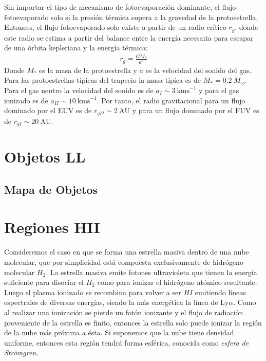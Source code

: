Sin importar el tipo de mecanismo de fotoevaporación dominante, el flujo fotoevaporado solo si la presión térmica supera a la gravedad de la protoestrella. Entonces, el flujo fotoevaporado solo existe a partir de un radio crítico $r_g$, donde este radio se estima a partir del balance entre la energía necesaria para escapar de una órbita kepleriana y la energía térmica:
\begin{align}
  r_g = \frac{GM_*}{a^2}
\end{align}
Donde $M_*$ es la masa de la protoestrella y $a$ es la velocidad del sonido del gas. Para las protoestrellas típicas del trapecio la masa típica es de
$M_* = 0.2~M_\odot$. Para el gas neutro la velocidad del sonido es de $a_I \sim 3~\mathrm{kms}^{-1}$ y para el gas ionizado es de $a_{II} \sim 10~\mathrm{kms}^{-1}$.
Por tanto, el radio gravitacional para un flujo dominado por el EUV es de $r_{gII} \sim 2~\mathrm{AU}$ y para un flujo dominado por el FUV es de $r_{gI} \sim 20~\mathrm{AU}$.
\section{Objetos LL}
\subsection{Mapa de Objetos}

\section{Regiones HII \citep{Stahler:2004}}
\label{sec:HII}
\newcommand\Nio{\ensuremath{\mathcal{N}}}

Consideremos el caso en que se forma una estrella masiva dentro de una nube molecular, que por simplicidad está compuesta exclusivamente de hidrógeno molecular $H_2$. La estrella masiva emite fotones ultravioleta que tienen la energía suficiente para disociar el $H_2$  como para ionizar el hidrógeno atómico resultante. Luego el plasma ionizado se recombina para volver a ser $HI$ emitiendo líneas espectrales de diversas energías, siendo la más energética la línea de $\mathrm{Ly}\alpha$. Como al realizar una ionización se pierde un fotón ionizante y el flujo de radiación proveniente de la estrella es finito, entonces la estrella solo puede ionizar la región de la nube más próxima a ésta. Si suponemos que la nube tiene densidad uniforme, entonces esta región tendrá forma esférica, conocida como \textit{esfera de Strömgren}.

